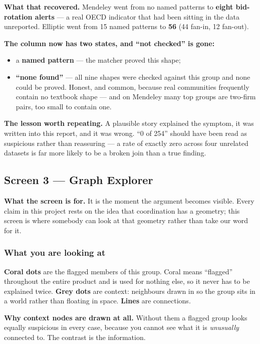 \documentclass[11pt,a4paper]{article}
\begin{document}
\begin{warnbox}
\textbf{What that recovered.} Mendeley went from no named patterns to
\textbf{eight bid-rotation alerts} --- a real OECD indicator that had been sitting
in the data unreported. Elliptic went from 15 named patterns to \textbf{56}
(44 fan-in, 12 fan-out).

\textbf{The column now has two states, and ``not checked'' is gone:}
\begin{itemize}
  \item a \textbf{named pattern} --- the matcher proved this shape;
  \item \textbf{``none found''} --- all nine shapes were checked against this
        group and none could be proved. Honest, and common, because real
        communities frequently contain no textbook shape --- and on Mendeley many
        top groups are two-firm pairs, too small to contain one.
\end{itemize}

\textbf{The lesson worth repeating.} A plausible story explained the symptom, it
was written into this report, and it was wrong. ``0 of 254'' should have been
read as suspicious rather than reassuring --- a rate of exactly zero across four
unrelated datasets is far more likely to be a broken join than a true finding.
\end{warnbox}

\subsection{Screen 3 --- Graph Explorer}

\textbf{What the screen is for.} It is the moment the argument becomes visible.
Every claim in this project rests on the idea that coordination has a geometry;
this screen is where somebody can look at that geometry rather than take our
word for it.

\subsubsection*{What you are looking at}

\textbf{Coral dots} are the flagged members of this group. Coral means
``flagged'' throughout the entire product and is used for nothing else, so it
never has to be explained twice. \textbf{Grey dots} are context: neighbours drawn
in so the group sits in a world rather than floating in space. \textbf{Lines}
are connections.

\textbf{Why context nodes are drawn at all.} Without them a flagged group looks
equally suspicious in every case, because you cannot see what it is
\emph{unusually} connected to. The contrast is the information.
\end{document}
